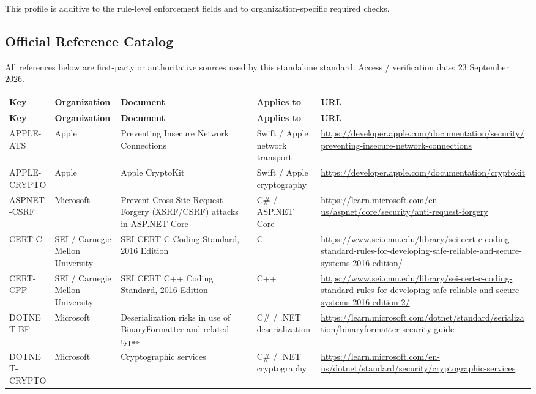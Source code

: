 \documentclass[10pt,letterpaper]{article}
\begin{document}
This profile is additive to the rule-level enforcement fields and to organization-specific required checks.
\begin{landscape}
\section{Official Reference Catalog}
All references below are first-party or authoritative sources used by this standalone standard. Access / verification date: 23 September 2026.

\scriptsize
\setlength{\tabcolsep}{3pt}
\begin{longtable}{@{}P{0.82in}P{1.23in}P{2.25in}P{1.7in}P{3.0in}@{}}
\toprule
\textbf{Key} & \textbf{Organization} & \textbf{Document} & \textbf{Applies to} & \textbf{URL}\\
\midrule
\endfirsthead
\toprule
\textbf{Key} & \textbf{Organization} & \textbf{Document} & \textbf{Applies to} & \textbf{URL}\\
\midrule
\endhead
APPLE-ATS & Apple & Preventing Insecure Network Connections & Swift / Apple network transport & \url{https://developer.apple.com/documentation/security/preventing-insecure-network-connections}\\
APPLE-CRYPTO & Apple & Apple CryptoKit & Swift / Apple cryptography & \url{https://developer.apple.com/documentation/cryptokit}\\
ASPNET-CSRF & Microsoft & Prevent Cross-Site Request Forgery (XSRF/CSRF) attacks in ASP.NET Core & C\# / ASP.NET Core & \url{https://learn.microsoft.com/en-us/aspnet/core/security/anti-request-forgery}\\
CERT-C & SEI / Carnegie Mellon University & SEI CERT C Coding Standard, 2016 Edition & C & \url{https://www.sei.cmu.edu/library/sei-cert-c-coding-standard-rules-for-developing-safe-reliable-and-secure-systems-2016-edition/}\\
CERT-CPP & SEI / Carnegie Mellon University & SEI CERT C++ Coding Standard, 2016 Edition & C++ & \url{https://www.sei.cmu.edu/library/sei-cert-c-coding-standard-rules-for-developing-safe-reliable-and-secure-systems-2016-edition-2/}\\
DOTNET-BF & Microsoft & Deserialization risks in use of BinaryFormatter and related types & C\# / .NET deserialization & \url{https://learn.microsoft.com/dotnet/standard/serialization/binaryformatter-security-guide}\\
DOTNET-CRYPTO & Microsoft & Cryptographic services & C\# / .NET cryptography & \url{https://learn.microsoft.com/en-us/dotnet/standard/security/cryptographic-services}\\

\end{longtable}
\end{landscape}
\end{document}
